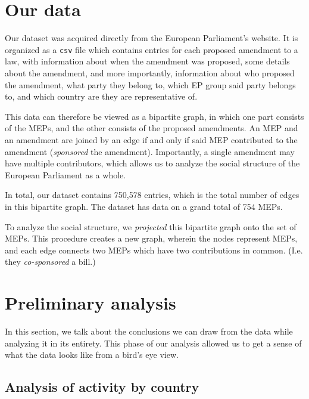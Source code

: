 \documentclass[lettersize,journal]{IEEEtran}
\begin{document}
\section{Our data} \label{sec:data}

Our dataset was acquired directly from the European Parliament's website. It is organized as a \texttt{csv} file which contains entries for each proposed amendment to a law, with information about when the amendment was proposed, some details about the amendment, and more importantly, information about who proposed the amendment, what party they belong to, which EP group said party belongs to, and which country are they are representative of.


This data can therefore be viewed as a bipartite graph, in which one part consists of the MEPs, and the other consists of the proposed amendments. An MEP and an amendment are joined by an edge if and only if said MEP contributed to the amendment (\textit{sponsored} the amendment). Importantly, a single amendment may have multiple contributors, which allows us to analyze the social structure of the European Parliament as a whole.

In total, our dataset contains 750,578 entries, which is the total number of edges in this bipartite graph. The dataset has data on a grand total of 754 MEPs. %

To analyze the social structure, we \textit{projected} this bipartite graph onto the set of MEPs. This procedure creates a new graph, wherein the nodes represent MEPs, and each edge connects two MEPs which have two contributions in common. (I.e. they \textit{co-sponsored} a bill.)


\section{Preliminary analysis} \label{sec:prelim_anal}

In this section, we talk about the conclusions we can draw from the data while analyzing it in its entirety. This phase of our analysis allowed us to get a sense of what the data looks like from a bird's eye view.

\subsection{Analysis of activity by country} \label{countryactivity}
\end{document}
